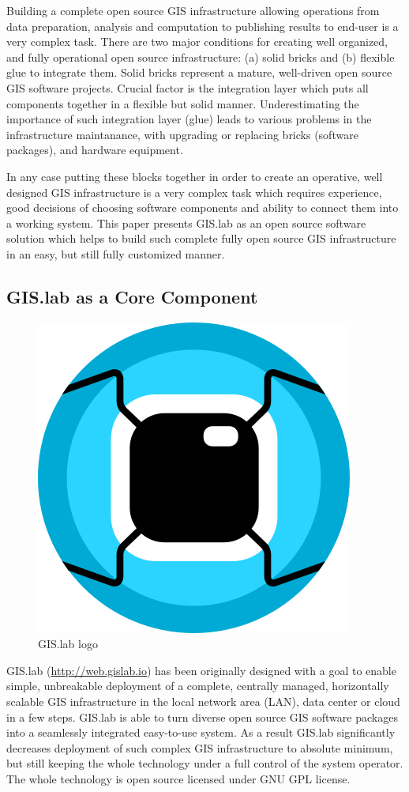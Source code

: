 \documentclass{isprs}
\begin{document}
Building a complete open source GIS infrastructure allowing operations
from data preparation, analysis and computation to publishing results
to end-user is a very complex task. There are two major conditions for
creating well organized, and fully operational open source
infrastructure: (a) solid bricks and (b) flexible glue to integrate
them. Solid bricks represent a mature, well-driven open source GIS
software projects. Crucial factor is the integration layer which puts all components
together in a flexible but solid manner. Underestimating the
importance of such integration layer (glue) leads to various problems in the 
infrastructure maintanance, with upgrading or replacing bricks (software packages), and
hardware equipment.

In any case putting these blocks together in order to create an operative, well
designed GIS infrastructure is a very complex task which requires
experience, good decisions of choosing software components and ability
to connect them into a working system. This paper presents GIS.lab as
an open source software solution which helps to build such complete fully
open source GIS infrastructure in an easy, but still fully customized
manner.

\subsection{GIS.lab as a Core Component}

\begin{figure}[ht!]
\begin{center}
  \includegraphics[width=.25\columnwidth]{figures/gislab-logo.png}
  \caption{GIS.lab logo}
\label{fig:gislab_logo}
\end{center}
\end{figure}

GIS.lab (\url{http://web.gislab.io}) has been originally designed with
a goal to enable simple, unbreakable deployment of a complete,
centrally managed, horizontally scalable GIS infrastructure in the
local network area (LAN), data center or cloud in a few steps. GIS.lab
is able to turn diverse open source GIS software packages into a
seamlessly integrated easy-to-use system. As a result GIS.lab
significantly decreases deployment of such complex GIS infrastructure
to absolute minimum, but still keeping the whole technology under a
full control of the system operator. The whole technology is open
source licensed under GNU GPL license.
\end{document}
